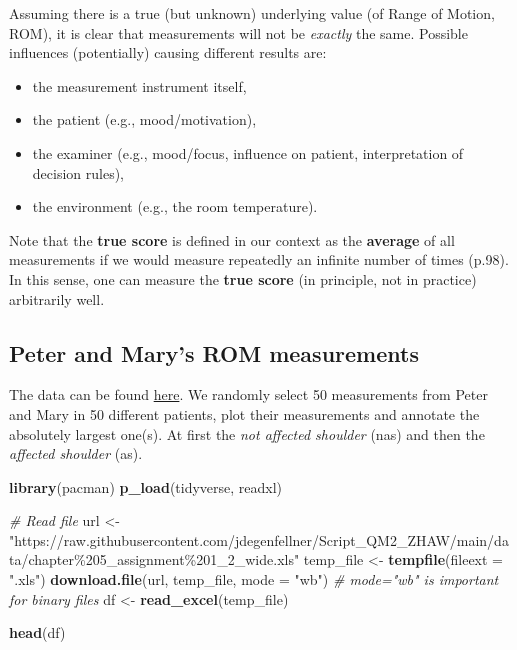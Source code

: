 \documentclass[
]{book}
\newenvironment{Shaded}{\begin{snugshade}}{\end{snugshade}}
\newcommand{\AttributeTok}[1]{\textcolor[rgb]{0.13,0.29,0.53}{#1}}
\newcommand{\CommentTok}[1]{\textcolor[rgb]{0.56,0.35,0.01}{\textit{#1}}}
\newcommand{\FunctionTok}[1]{\textcolor[rgb]{0.13,0.29,0.53}{\textbf{#1}}}
\newcommand{\NormalTok}[1]{#1}
\newcommand{\OtherTok}[1]{\textcolor[rgb]{0.56,0.35,0.01}{#1}}
\newcommand{\StringTok}[1]{\textcolor[rgb]{0.31,0.60,0.02}{#1}}
\providecommand{\tightlist}{%
  \setlength{\itemsep}{0pt}\setlength{\parskip}{0pt}}
\begin{document}
Assuming there is a true (but unknown) underlying value (of Range of Motion, ROM),
it is clear that measurements will not be \emph{exactly} the same.
Possible influences (potentially) causing different results are:

\begin{itemize}
\tightlist
\item
  the measurement instrument itself,
\item
  the patient (e.g., mood/motivation),
\item
  the examiner (e.g., mood/focus, influence on patient, interpretation of decision rules),
\item
  the environment (e.g., the room temperature).
\end{itemize}

Note that the \textbf{true score} is defined in our context as the \textbf{average}
of all measurements if we would measure repeatedly an infinite number of times (p.98).
In this sense, one can measure the \textbf{true score} (in principle, not in practice)
arbitrarily well.

\subsection{Peter and Mary's ROM measurements}\label{peter-and-marys-rom-measurements}

The data can be found \href{https://www.cosmin.nl/book-measurement-in-medicine/}{here}.
We randomly select 50 measurements from Peter and Mary in 50 different patients,
plot their measurements and annotate the absolutely largest one(s). At first the
\emph{not affected shoulder} (nas) and then the \emph{affected shoulder} (as).

\begin{Shaded}
\begin{Highlighting}[]
\FunctionTok{library}\NormalTok{(pacman)}
\FunctionTok{p\_load}\NormalTok{(tidyverse, readxl)}

\CommentTok{\# Read file}
\NormalTok{url }\OtherTok{\textless{}{-}} \StringTok{"https://raw.githubusercontent.com/jdegenfellner/Script\_QM2\_ZHAW/main/data/chapter\%205\_assignment\%201\_2\_wide.xls"}
\NormalTok{temp\_file }\OtherTok{\textless{}{-}} \FunctionTok{tempfile}\NormalTok{(}\AttributeTok{fileext =} \StringTok{".xls"}\NormalTok{)}
\FunctionTok{download.file}\NormalTok{(url, temp\_file, }\AttributeTok{mode =} \StringTok{"wb"}\NormalTok{)  }\CommentTok{\# mode="wb" is important for binary files}
\NormalTok{df }\OtherTok{\textless{}{-}} \FunctionTok{read\_excel}\NormalTok{(temp\_file)}

\FunctionTok{head}\NormalTok{(df)}
\end{Highlighting}
\end{Shaded}
\end{document}
